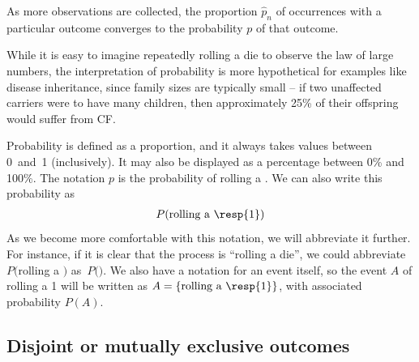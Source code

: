\begin{termBox}{
As more observations are collected, the proportion $\hat{p}_n$ of occurrences with a particular outcome converges to the probability $p$ of that outcome.}
\end{termBox}


While it is easy to imagine repeatedly rolling a die to observe the law of large numbers, the interpretation of probability is more hypothetical for examples like disease inheritance, since family sizes are typically small -- if two unaffected carriers were to have many children, then approximately 25\% of their offspring would suffer from CF.

Probability is defined as a proportion, and it always takes values between 0~and~1 (inclusively). It may also be displayed as a percentage between 0\% and 100\%. The notation $p$ is the probability of rolling a . We can also write this probability as
\begin{eqnarray*}
P(\text{rolling a \resp{1}})
\end{eqnarray*}
As we become more comfortable with this notation, we will abbreviate it further. For instance, if it is clear that the process is ``rolling a die'', we could abbreviate $P($rolling a $)$ as~$P($$)$.  We also have a notation for an event itself, so the event $A$ of rolling a 1 will be written as $A = \{\text{rolling a \resp{1}}\}$, with associated probability $P(A)$. 


\subsection{Disjoint or mutually exclusive outcomes}


